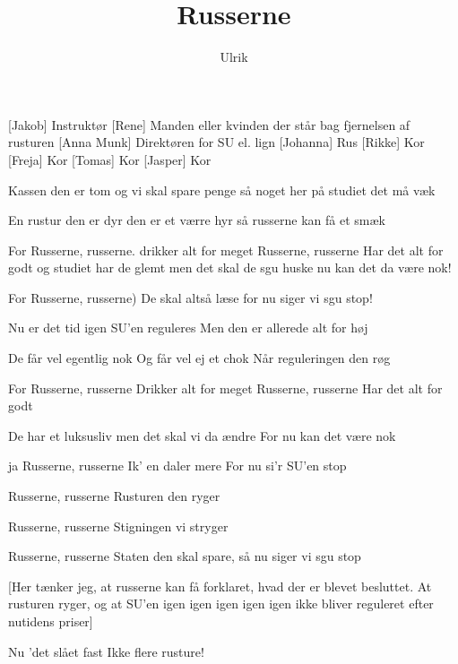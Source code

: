 \documentclass[a4paper,11pt]{article}
\title{Russerne}
\author{Ulrik}
\begin{document}
\maketitle

\begin{roles}
[Jakob] Instruktør
[Rene] Manden eller kvinden der står bag fjernelsen af rusturen
[Anna Munk] Direktøren for SU el. lign
[Johanna] Rus
[Rikke] Kor
[Freja] Kor
[Tomas] Kor
[Jasper] Kor
\end{roles}

\begin{song}
Kassen den er tom
og vi skal spare penge 
så noget her på studiet det må væk

En rustur den er dyr
den er et værre hyr 
så russerne kan få et smæk
 
For 
 Russerne, russerne.
 drikker alt for meget
 Russerne, russerne
 Har det alt for godt
og studiet har de glemt
men det skal de sgu huske 
nu kan det da være nok!

For 
 Russerne, russerne)
 De skal altså læse 
 for nu siger vi sgu stop!

 Nu er det tid igen
SU'en reguleres 
Men den er allerede alt for høj

De får vel egentlig nok
Og får vel ej et chok 
Når reguleringen den røg

For
 Russerne, russerne
 Drikker alt for meget
 Russerne, russerne 
 Har det alt for godt

De har et luksusliv
men det skal vi da ændre
For nu kan det være nok

ja
 Russerne, russerne
 Ik' en daler mere 
 For nu si'r SU'en stop

 Russerne, russerne
 Rusturen den ryger

 Russerne, russerne
 Stigningen vi stryger

 Russerne, russerne
Staten den skal spare, 
så nu siger vi sgu stop

[Her tænker jeg, at russerne kan få forklaret, hvad der er blevet besluttet. At rusturen ryger, og at SU'en igen igen igen igen igen ikke bliver reguleret efter nutidens priser]

 Nu 'det slået fast
Ikke flere rusture!


\end{song}
\end{document}

